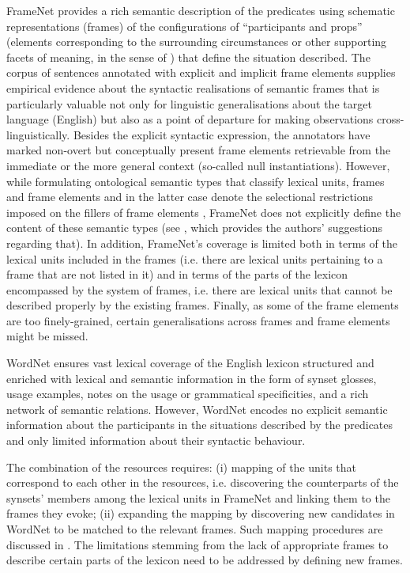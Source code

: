 \documentclass[output=paper,colorlinks,citecolor=brown]{langscibook}
\begin{document}
FrameNet provides a rich semantic description of the predicates using schematic representations (frames) of the configurations of “participants and props” (elements corresponding to the surrounding circumstances or other supporting facets of meaning, in the sense of \cite[7]{Ruppenhofer2016}) that define the situation described. The corpus of sentences annotated with explicit and implicit frame elements supplies empirical evidence about the syntactic realisations of semantic frames that is particularly valuable not only for linguistic generalisations about the target language (English) but also as a point of departure for making observations cross-linguistically. Besides the explicit syntactic expression, the annotators have marked non-overt but conceptually present frame elements retrievable from the immediate or the more general context (so-called null instantiations). However, while formulating ontological semantic types that classify lexical units, frames and frame elements and in the latter case denote the selectional restrictions imposed on the fillers of frame elements \citep[86]{Ruppenhofer2016}, FrameNet does not explicitly define the content of these semantic types (see , which provides the authors' suggestions regarding that). In addition, FrameNet's coverage is limited both in terms of the lexical units included in the frames (i.e. there are lexical units pertaining to a frame that are not listed in it) and in terms of the parts of the lexicon encompassed by the system of frames, i.e. there are lexical units that cannot be described properly by the existing frames. Finally, as some of the frame elements are too finely-grained, certain generalisations across frames and frame elements might be missed.

WordNet ensures vast lexical coverage of the English lexicon structured and enriched with lexical and semantic information in the form of synset glosses, usage examples, notes on the usage or grammatical specificities, and a rich network of semantic relations. However, WordNet encodes no explicit semantic information about the participants in the situations described by the predicates and only limited information about their syntactic behaviour. 

The combination of the resources requires: (i) mapping of the units that correspond to each other in the resources, i.e. discovering the counterparts of the synsets' members among the lexical units in FrameNet and linking them to the frames they evoke; (ii) expanding the mapping by discovering new candidates in WordNet to be matched to the relevant frames.  
Such mapping procedures are discussed in . The limitations stemming from the lack of appropriate frames to describe certain parts of the lexicon need to be addressed by defining new frames.
\end{document}
